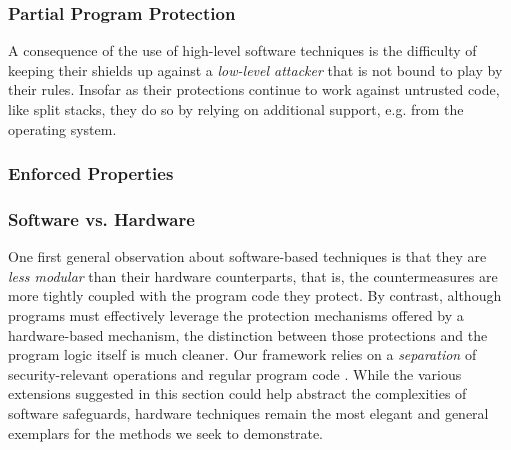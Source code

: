 \subsubsection{Partial Program Protection}
%
A consequence of the use of high-level software techniques is the difficulty of
keeping their shields up against a \emph{low-level attacker} that is not bound
to play by their rules.
%
Insofar as their protections continue to work against untrusted code, like split
stacks, they do so by relying on additional support, e.g. from the operating
system.
%
%

\subsubsection{Enforced Properties}
%

\subsubsection{Software vs. Hardware}
%
One first general observation about software-based techniques is that they
are \emph{less modular} than their hardware counterparts, that is, the
countermeasures are more tightly coupled with the program code they protect.
%
By contrast, although programs must effectively leverage the protection
mechanisms offered by a hardware-based mechanism, the distinction between those protections
and the program logic itself is much cleaner.
%
Our framework relies on a \emph{separation} of security-relevant operations and
regular program code .
%
While the various extensions suggested in this section could help abstract the
complexities of software safeguards, hardware techniques remain the most elegant
and general exemplars for the methods we seek to demonstrate.
%


